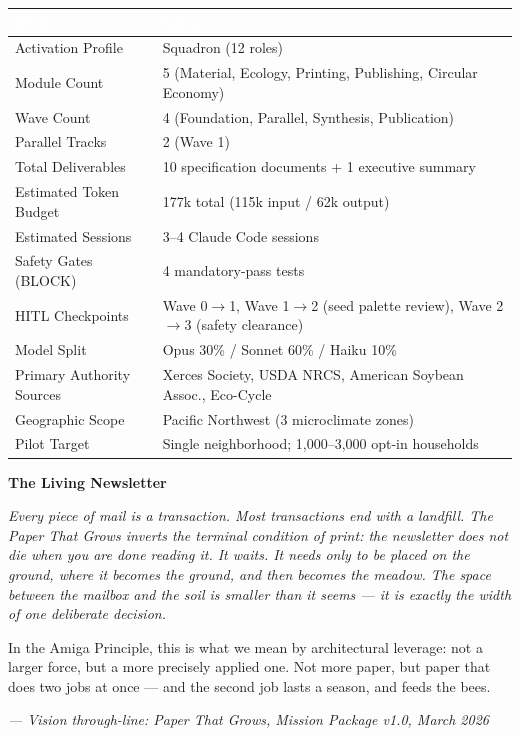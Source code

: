 \documentclass[11pt,letterpaper]{article}
\newcommand{\tableheader}[1]{\textbf{\sffamily\textcolor{white}{#1}}}
\begin{document}
\begin{center}
\begin{tabularx}{\textwidth}{L{4cm}X}
\toprule
{}
\tableheader{Metric} & \tableheader{Value} \\
\midrule
Activation Profile & Squadron (12 roles) \\
Module Count & 5 (Material, Ecology, Printing, Publishing, Circular Economy) \\
Wave Count & 4 (Foundation, Parallel, Synthesis, Publication) \\
Parallel Tracks & 2 (Wave 1) \\
Total Deliverables & 10 specification documents + 1 executive summary \\
Estimated Token Budget & 177k total (115k input / 62k output) \\
Estimated Sessions & 3--4 Claude Code sessions \\
Safety Gates (BLOCK) & 4 mandatory-pass tests \\
HITL Checkpoints & Wave 0$\rightarrow$1, Wave 1$\rightarrow$2 (seed palette review), Wave 2$\rightarrow$3 (safety clearance) \\
Model Split & Opus 30\% / Sonnet 60\% / Haiku 10\% \\
Primary Authority Sources & Xerces Society, USDA NRCS, American Soybean Assoc., Eco-Cycle \\
Geographic Scope & Pacific Northwest (3 microclimate zones) \\
Pilot Target & Single neighborhood; 1,000--3,000 opt-in households \\
\bottomrule
\end{tabularx}
\end{center}

\vspace{2em}

\begin{quotebox}
\textbf{\sffamily\large The Living Newsletter}

\vspace{0.5em}
{\itshape Every piece of mail is a transaction. Most transactions end with a landfill.
The Paper That Grows inverts the terminal condition of print: the newsletter does not die when you are done reading it.
It waits. It needs only to be placed on the ground, where it becomes the ground, and then becomes the meadow.
The space between the mailbox and the soil is smaller than it seems ---
it is exactly the width of one deliberate decision.

In the Amiga Principle, this is what we mean by architectural leverage:
not a larger force, but a more precisely applied one.
Not more paper, but paper that does two jobs at once ---
and the second job lasts a season, and feeds the bees.}

\vspace{0.5em}
\textit{--- Vision through-line: Paper That Grows, Mission Package v1.0, March 2026}
\end{quotebox}
\end{document}
